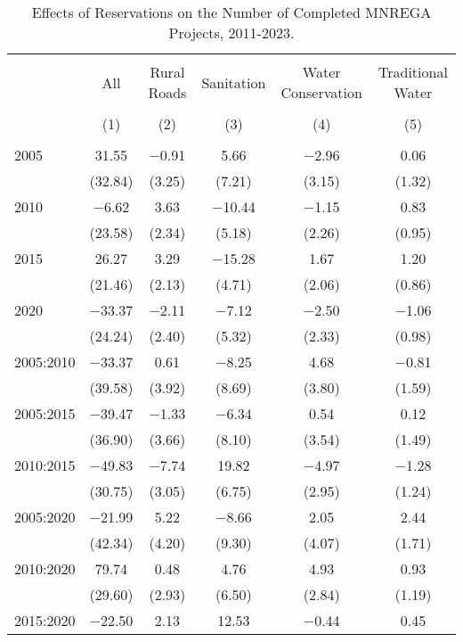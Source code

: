 
\begin{table}[!htbp] \centering 
  \caption{Effects of Reservations on the Number of Completed MNREGA Projects, 2011-2023.} 
  \label{main_mnrega_2011_2023} 
\begin{tabular}{@{\extracolsep{5pt}}lccccc} 
\\[-1.8ex]\hline 
\hline \\[-1.8ex] 
 & All & Rural Roads & Sanitation & Water Conservation & Traditional Water \\ 
\\[-1.8ex] & (1) & (2) & (3) & (4) & (5)\\ 
\hline \\[-1.8ex] 
 2005 & 31.55 & $-$0.91 & 5.66 & $-$2.96 & 0.06 \\ 
  & (32.84) & (3.25) & (7.21) & (3.15) & (1.32) \\ 
  2010 & $-$6.62 & 3.63 & $-$10.44 & $-$1.15 & 0.83 \\ 
  & (23.58) & (2.34) & (5.18) & (2.26) & (0.95) \\ 
  2015 & 26.27 & 3.29 & $-$15.28 & 1.67 & 1.20 \\ 
  & (21.46) & (2.13) & (4.71) & (2.06) & (0.86) \\ 
  2020 & $-$33.37 & $-$2.11 & $-$7.12 & $-$2.50 & $-$1.06 \\ 
  & (24.24) & (2.40) & (5.32) & (2.33) & (0.98) \\ 
  2005:2010 & $-$33.37 & 0.61 & $-$8.25 & 4.68 & $-$0.81 \\ 
  & (39.58) & (3.92) & (8.69) & (3.80) & (1.59) \\ 
  2005:2015 & $-$39.47 & $-$1.33 & $-$6.34 & 0.54 & 0.12 \\ 
  & (36.90) & (3.66) & (8.10) & (3.54) & (1.49) \\ 
  2010:2015 & $-$49.83 & $-$7.74 & 19.82 & $-$4.97 & $-$1.28 \\ 
  & (30.75) & (3.05) & (6.75) & (2.95) & (1.24) \\ 
  2005:2020 & $-$21.99 & 5.22 & $-$8.66 & 2.05 & 2.44 \\ 
  & (42.34) & (4.20) & (9.30) & (4.07) & (1.71) \\ 
  2010:2020 & 79.74 & 0.48 & 4.76 & 4.93 & 0.93 \\ 
  & (29.60) & (2.93) & (6.50) & (2.84) & (1.19) \\ 
  2015:2020 & $-$22.50 & 2.13 & 12.53 & $-$0.44 & 0.45 \\ 

\end{tabular}
\end{table}
